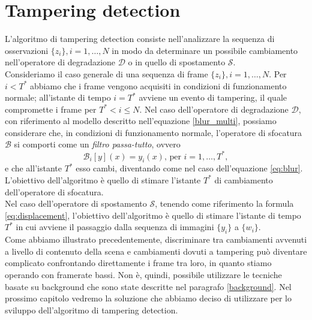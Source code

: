 \section{Tampering detection}
L'algoritmo di tampering detection consiste nell'analizzare la sequenza di osservazioni $\{z_i\}, i=1, \dots , N$ in modo da determinare un possibile cambiamento nell'operatore di degradazione $\mathcal{D}$ o in quello di spostamento $\mathcal{S}$.\\
Consideriamo il caso generale di una sequenza di frame $\{z_i\}, i=1,\dots,N$. 
Per $i<T^*$ abbiamo che i frame vengono acquisiti in condizioni di funzionamento normale; 
all'istante di tempo $i = T^*$ avviene un evento di tampering, il quale compromette i frame per $T^*<i\leq N$.  
Nel caso dell'operatore di degradazione $\mathcal{D}$, con riferimento al modello descritto nell'equazione \eqref{blur_multi}, possiamo considerare che, in condizioni di funzionamento normale, l'operatore di sfocatura $\mathcal{B}$ si comporti come un \textit{filtro passa-tutto}, ovvero
\[\mathcal{B}_i[y](x)=y_i(x) \mbox{, per } i=1,\dots, T^*,\]
e che all'istante $T^*$ esso cambi, diventando come nel caso dell'equazione \eqref{eq:blur}.
L'obiettivo dell'algoritmo \`e quello di stimare l'istante $T^*$ di cambiamento dell'operatore di sfocatura.\\
Nel caso dell'operatore di spostamento $\mathcal{S}$, tenendo come riferimento la formula \eqref{eq:displacement}, l'obiettivo dell'algoritmo \`e quello di stimare l'istante di tempo $T^*$ in cui avviene il passaggio dalla sequenza di immagini $\{y_i\}$ a $\{w_i\}$.\\
Come abbiamo illustrato precedentemente, discriminare tra cambiamenti avvenuti a livello di contenuto della scena e cambiamenti dovuti a tampering pu\`o diventare complicato confrontando direttamente i frame tra loro, in quanto stiamo operando con framerate bassi.
Non \`e, quindi, possibile utilizzare le tecniche basate su background che sono state descritte nel paragrafo \ref{background}.
Nel prossimo capitolo vedremo la soluzione che abbiamo deciso di utilizzare per lo sviluppo dell'algoritmo di tampering detection. 
